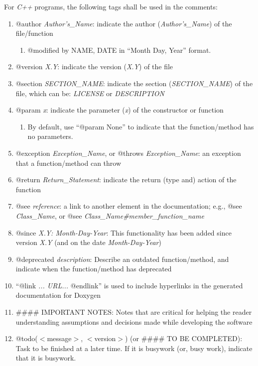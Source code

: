 \documentclass[letter,12pt]{article}
\begin{document}
For {\it C++} programs, the following tags shall be used in the comments: \vspace{-0.3cm}
\begin{enumerate} \itemsep -4pt
\item @author {\it Author's\_Name}: indicate the author ({\it Author's\_Name}) of the file/function \vspace{-0.3cm}
	\begin{enumerate} \itemsep -2pt
	\item @modified by NAME, DATE in ``Month Day, Year'' format.
	\end{enumerate}
\item @version {\it X.Y}: indicate the version ({\it X.Y}) of the file
\item @section {\it SECTION\_NAME}: indicate the section ({\it SECTION\_NAME}) of the file, which can be: {\it LICENSE} or {\it DESCRIPTION}
\item @param {\it x}: indicate the parameter ({\it x}) of the constructor or function \vspace{-0.3cm}
	\begin{enumerate} \itemsep -2pt
	\item By default, use ``@param None'' to indicate that the function/method has no parameters.
	\end{enumerate}
\item @exception {\it Exception\_Name}, or @throws {\it Exception\_Name}: an exception that a function/method can throw
\item @return {\it Return\_Statement}: indicate the return (type and) action of the function
\item @see {\it reference}: a link to another element in the documentation; e.g., @see {\it Class\_Name}, or @see {\it Class\_Name\#member\_function\_name}
\item @since {\it X.Y: Month-Day-Year}: This functionality has been added since version {\it X.Y} (and on the date {\it Month-Day-Year})
\item @deprecated {\it description}: Describe an outdated function/method, and indicate when the function/method has deprecated
\item ``@link {\it ... URL...} @endlink'' is used to include hyperlinks in the generated documentation for Doxygen
\item \#\#\#\# IMPORTANT NOTES: Notes that are critical for helping the reader understanding assumptions and decisions made while developing the software
\item @todo($<$message$>$, $<$version$>$) (or \#\#\#\# TO BE COMPLETED): Task to be finished at a later time. If it is busywork (or, busy work), indicate that it is busywork.

\end{enumerate}
\end{document}
